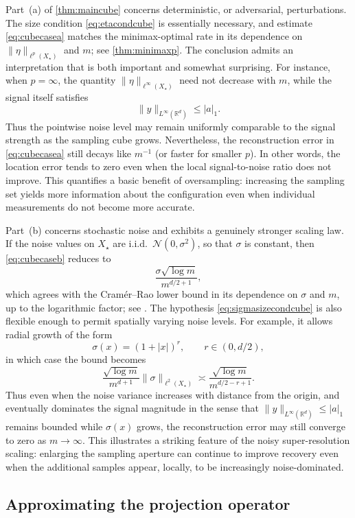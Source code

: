 \documentclass[11pt]{article}
\theoremstyle{definition}
\numberwithin{theorem}{section}
\numberwithin{lemma}{section}
\numberwithin{equation}{section}
\def\R{\mathbb{R}}
\newcommand{\sampset}{X}
\numberwithin{equation}{section}
\begin{document}
Part~(a) of \cref{thm:maincube} concerns deterministic, or adversarial, perturbations. The size condition \eqref{eq:etacondcube} is essentially necessary, and estimate \eqref{eq:cubecasea} matches the minimax-optimal rate in its dependence on $\|\eta\|_{\ell^p(\sampset_\star)}$ and $m$; see \cref{thm:minimaxp}. The conclusion admits an interpretation that is both important and somewhat surprising. For instance, when $p=\infty$, the quantity $\|\eta\|_{\ell^\infty(\sampset_\star)}$ need not decrease with $m$, while the signal itself satisfies
\[
\|y\|_{L^\infty(\R^d)}\le |a|_1.
\]
Thus the pointwise noise level may remain uniformly comparable to the signal strength as the sampling cube grows. Nevertheless, the reconstruction error in \eqref{eq:cubecasea} still decays like $m^{-1}$ (or faster for smaller $p$). In other words, the location error tends to zero even when the local signal-to-noise ratio does not improve. This quantifies a basic benefit of oversampling: increasing the sampling set yields more information about the configuration even when individual measurements do not become more accurate.

Part~(b) concerns stochastic noise and exhibits a genuinely stronger scaling law. If the noise values on $\sampset_\star$ are i.i.d.\ $\mathcal N(0,\sigma^2)$, so that $\sigma$ is constant, then \eqref{eq:cubecaseb} reduces to
\[
\frac{\sigma\sqrt{\log m}}{m^{d/2+1}},
\]
which agrees with the Cram\'er--Rao lower bound in its dependence on $\sigma$ and $m$, up to the logarithmic factor; see \cite{stoica1989music}. The hypothesis \eqref{eq:sigmasizecondcube} is also flexible enough to permit spatially varying noise levels. For example, it allows radial growth of the form
\[
\sigma(x)=(1+|x|)^r,
\qquad r\in(0,d/2),
\]
in which case the bound becomes
\[
\frac{\sqrt{\log m}}{m^{d+1}}\|\sigma\|_{\ell^2(\sampset_\star)}
\asymp
\frac{\sqrt{\log m}}{m^{d/2-r+1}}.
\]
Thus even when the noise variance increases with distance from the origin, and eventually dominates the signal magnitude in the sense that $\|y\|_{L^\infty(\R^d)}\le |a|_1$ remains bounded while $\sigma(x)$ grows, the reconstruction error may still converge to zero as $m\to\infty$. This illustrates a striking feature of the noisy super-resolution scaling: enlarging the sampling aperture can continue to improve recovery even when the additional samples appear, locally, to be increasingly noise-dominated. 

	 
	\subsection{Approximating the projection operator}
	\label{sec:hankeldiscrete}
	
\end{document}
